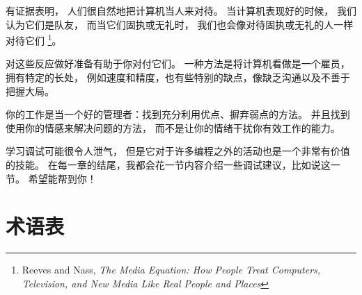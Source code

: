 有证据表明， 人们很自然地把计算机当人来对待。  
当计算机表现好的时候， 我们认为它们是队友， 而当它们固执或无礼时， 我们也会像对待固执或无礼的人一样对待它们 
\footnote{Reeves and Nass, {\it The Media Equation: How People Treat Computers, Television, and New Media Like Real People and Places}}。

  
  


对这些反应做好准备有助于你对付它们。  一种方法是将计算机看做是一个雇员，拥有特定的长处， 例如速度和精度，也有些特别的缺点，像缺乏沟通以及不善于把握大局。


你的工作是当一个好的管理者：找到充分利用优点、摒弃弱点的方法。  并且找到使用你的情感来解决问题的方法， 而不是让你的情绪干扰你有效工作的能力。


学习调试可能很令人泄气， 但是它对于许多编程之外的活动也是一个非常有价值的技能。  在每一章的结尾，我都会花一节内容介绍一些调试建议，比如说这一节。 希望能帮到你！

\section{术语表}

